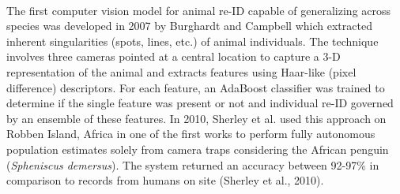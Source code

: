 \documentclass[11pt]{article}
\begin{document}
\newline
\\
The first computer vision model for animal re-ID capable of generalizing across species was developed in 2007 by Burghardt and Campbell which extracted inherent singularities (spots, lines, etc.) of animal individuals. The technique involves three cameras pointed at a central location to capture a 3-D representation of the animal and extracts features using Haar-like (pixel difference) descriptors. For each feature, an AdaBoost classifier was trained to determine if the single feature was present or not and individual re-ID governed by an ensemble of these features. In 2010, Sherley et al. used this approach on Robben Island, Africa in one of the first works to perform fully autonomous population estimates solely from camera traps considering the African penguin (\textit{Spheniscus demersus}). The system returned an accuracy between 92-97\% in comparison to records from humans on site (Sherley et al., 2010).
\newline
\\
\end{document}
